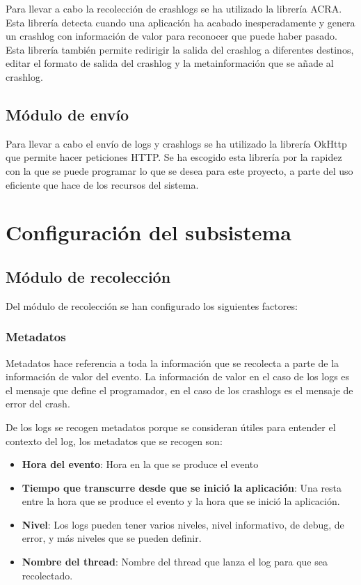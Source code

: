 Para llevar a cabo la recolección de crashlogs se ha utilizado la librería ACRA\cite{Tfg:acra}. Esta librería detecta cuando una aplicación ha acabado inesperadamente y genera un crashlog con información de valor para reconocer que puede haber pasado. Esta librería también permite redirigir la salida del crashlog a diferentes destinos, editar el formato de salida del crashlog y la metainformación que se añade al crashlog.

\subsection{Módulo de envío}
Para llevar a cabo el envío de logs y crashlogs se ha utilizado la librería OkHttp\cite{Tfg:okhttp} que permite hacer peticiones HTTP\cite{Tfg:HTTPv1-1}. Se ha escogido esta librería por la rapidez con la que se puede programar lo que se desea para este proyecto, a parte del uso eficiente que hace de los recursos del sistema.

\section{Configuración del subsistema}

\subsection{Módulo de recolección}


Del módulo de recolección se han configurado los siguientes factores:

\subsubsection{Metadatos}
Metadatos hace referencia a toda la información que se recolecta a parte de la información de valor del evento. La información de valor en el caso de los logs es el mensaje que define el programador, en el caso de los crashlogs es el mensaje de error del crash.

De los logs se recogen metadatos porque se consideran útiles para entender el contexto del log, los metadatos que se recogen son:

\begin{itemize}	
	\item \textbf{Hora del evento}: Hora en la que se produce el evento
	\item \textbf{Tiempo que transcurre desde que se inició la aplicación}: Una resta entre la hora que se produce el evento y la hora que se inició la aplicación.
	\item \textbf{Nivel}: Los logs pueden tener varios niveles, nivel informativo, de debug, de error, y más niveles que se pueden definir.
	\item \textbf{Nombre del thread}: Nombre del thread que lanza el log para que sea recolectado.
\end{itemize}

